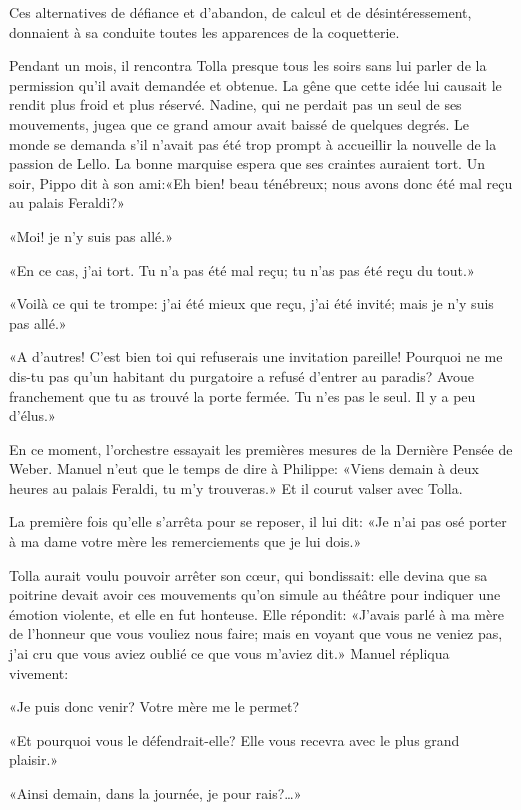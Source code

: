 Ces alternatives de défiance et d'abandon, de calcul et de
désintéressement, donnaient à sa conduite toutes les apparences de la
coquetterie.

Pendant un mois, il rencontra Tolla presque tous les soirs sans lui
parler de la permission qu'il avait demandée et obtenue. La gêne que
cette idée lui causait le rendit plus froid et plus réservé. Nadine, qui
ne perdait pas un seul de ses mouvements, jugea que ce grand amour avait
baissé de quelques degrés. Le monde se demanda s'il n'avait pas été trop
prompt à accueillir la nouvelle de la passion de Lello. La bonne
marquise espera que ses craintes auraient tort. Un soir, Pippo dit à son
ami:«Eh bien! beau ténébreux; nous avons donc été mal reçu au palais
Feraldi?»

«Moi! je n'y suis pas allé.»

«En ce cas, j'ai tort. Tu n'a pas été mal reçu; tu n'as pas été reçu du
tout.»

«Voilà ce qui te trompe: j'ai été mieux que reçu, j'ai été invité; mais
je n'y suis pas allé.»

«A d'autres! C'est bien toi qui refuserais une invitation pareille!
Pourquoi ne me dis-tu pas qu'un habitant du purgatoire a refusé d'entrer
au paradis? Avoue franchement que tu as trouvé la porte fermée. Tu n'es
pas le seul. Il y a peu d'élus.»

En ce moment, l'orchestre essayait les premières mesures de la Dernière
Pensée de Weber. Manuel n'eut que le temps de dire à Philippe: «Viens
demain à deux heures au palais Feraldi, tu m'y trouveras.» Et il courut
valser avec Tolla.

La première fois qu'elle s'arrêta pour se reposer, il lui dit: «Je n'ai
pas osé porter à ma dame votre mère les remerciements que je lui dois.»

Tolla aurait voulu pouvoir arrêter son cœur, qui bondissait: elle devina
que sa poitrine devait avoir ces mouvements qu'on simule au théâtre pour
indiquer une émotion violente, et elle en fut honteuse. Elle répondit:
«J'avais parlé à ma mère de l'honneur que vous vouliez nous faire; mais
en voyant que vous ne veniez pas, j'ai cru que vous aviez oublié ce que
vous m'aviez dit.» Manuel répliqua vivement:

«Je puis donc venir? Votre mère me le permet?

«Et pourquoi vous le défendrait-elle? Elle vous recevra avec le plus
grand plaisir.»

«Ainsi demain, dans la journée, je pour rais?\ldots»

